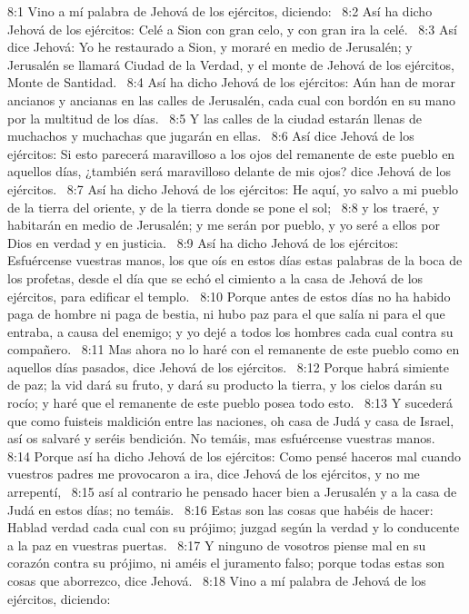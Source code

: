 8:1 Vino a mí palabra de Jehová de los ejércitos, diciendo:  
8:2 Así ha dicho Jehová de los ejércitos: Celé a Sion con gran celo, y con gran ira la celé.  
8:3 Así dice Jehová: Yo he restaurado a Sion, y moraré en medio de Jerusalén; y Jerusalén se llamará Ciudad de la Verdad, y el monte de Jehová de los ejércitos, Monte de Santidad.  
8:4 Así ha dicho Jehová de los ejércitos: Aún han de morar ancianos y ancianas en las calles de Jerusalén, cada cual con bordón en su mano por la multitud de los días.  
8:5 Y las calles de la ciudad estarán llenas de muchachos y muchachas que jugarán en ellas.  
8:6 Así dice Jehová de los ejércitos: Si esto parecerá maravilloso a los ojos del remanente de este pueblo en aquellos días, ¿también será maravilloso delante de mis ojos? dice Jehová de los ejércitos.  
8:7 Así ha dicho Jehová de los ejércitos: He aquí, yo salvo a mi pueblo de la tierra del oriente, y de la tierra donde se pone el sol;  
8:8 y los traeré, y habitarán en medio de Jerusalén; y me serán por pueblo, y yo seré a ellos por Dios en verdad y en justicia.  
8:9 Así ha dicho Jehová de los ejércitos: Esfuércense vuestras manos, los que oís en estos días estas palabras de la boca de los profetas, desde el día que se echó el cimiento a la casa de Jehová de los ejércitos, para edificar el templo.  
8:10 Porque antes de estos días no ha habido paga de hombre ni paga de bestia, ni hubo paz para el que salía ni para el que entraba, a causa del enemigo; y yo dejé a todos los hombres cada cual contra su compañero.  
8:11 Mas ahora no lo haré con el remanente de este pueblo como en aquellos días pasados, dice Jehová de los ejércitos.  
8:12 Porque habrá simiente de paz; la vid dará su fruto, y dará su producto la tierra, y los cielos darán su rocío; y haré que el remanente de este pueblo posea todo esto.  
8:13 Y sucederá que como fuisteis maldición entre las naciones, oh casa de Judá y casa de Israel, así os salvaré y seréis bendición. No temáis, mas esfuércense vuestras manos.  
8:14 Porque así ha dicho Jehová de los ejércitos: Como pensé haceros mal cuando vuestros padres me provocaron a ira, dice Jehová de los ejércitos, y no me arrepentí,  
8:15 así al contrario he pensado hacer bien a Jerusalén y a la casa de Judá en estos días; no temáis.  
8:16 Estas son las cosas que habéis de hacer: Hablad verdad cada cual con su prójimo; juzgad según la verdad y lo conducente a la paz en vuestras puertas.  
8:17 Y ninguno de vosotros piense mal en su corazón contra su prójimo, ni améis el juramento falso; porque todas estas son cosas que aborrezco, dice Jehová.  
8:18 Vino a mí palabra de Jehová de los ejércitos, diciendo:  
